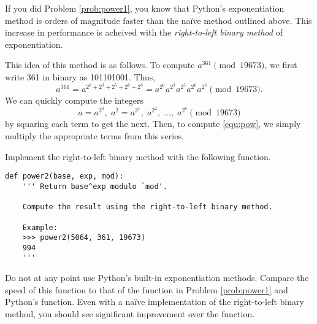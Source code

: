 If you did Problem \ref{prob:power1}, you know that Python's exponentiation method is orders of magnitude faster than the na\"ive method outlined above.
This increase in performance is acheived with the \emph{right-to-left binary method} of exponentiation.

This idea of this method is as follows. 
To compute $a^{361} \pmod{19673}$, we first write 361 in binary as 101101001. Thus,
\begin{equation}\label{equ:pow}
a^{361} = a^{2^0+2^3+2^5+2^6+2^8} = a^{2^0}a^{2^3}a^{2^5}a^{2^6}a^{2^8} \pmod{19673}.
\end{equation}
We can quickly compute the integers
\[
a=a^{2^0},\; a^2=a^{2^1}, \;a^{2^2}, \;\ldots, \;a^{2^8} \pmod{19673}
\]
by squaring each term to get the next. 
Then, to compute \eqref{equ:pow}, we simply multiply the appropriate terms from this series.

\begin{problem}
Implement the right-to-left binary method with the following function.
\begin{lstlisting}
def power2(base, exp, mod):
    ''' Return base^exp modulo `mod'.
    
    Compute the result using the right-to-left binary method.
    
    Example:
    >>> power2(5064, 361, 19673)
    994
    '''
\end{lstlisting}
Do not at any point use Python's built-in exponentiation methods.
Compare the speed of this function to that of the function in Problem \ref{prob:power1} and Python's  function.
Even with a na\"ive implementation of the right-to-left binary method, you should see significant improvement over the  function.
\end{problem}



